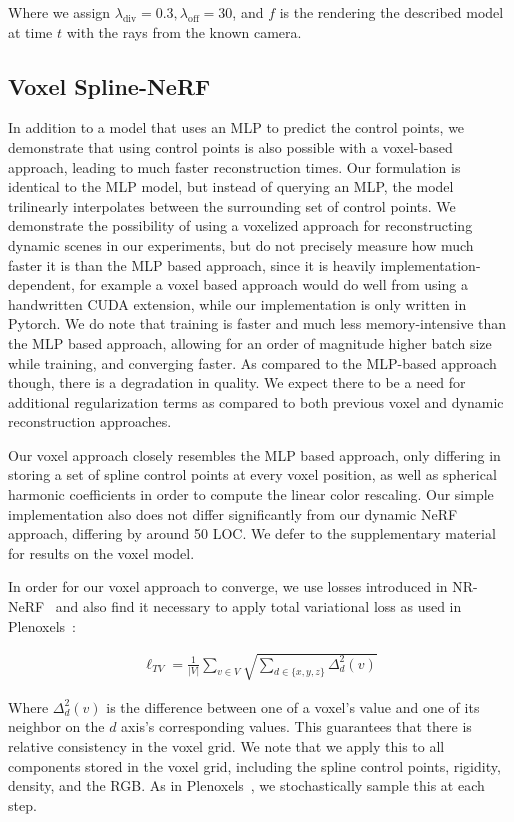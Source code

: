 Where we assign $\lambda_\text{div} = 0.3, \lambda_\text{off} = 30$, and $f$ is the rendering the described model at time $t$ with the rays from the known camera.

\subsection*{Voxel Spline-NeRF}

In addition to a model that uses an MLP to predict the control points, we demonstrate that using control points is also possible with a voxel-based approach, leading to much faster reconstruction times. Our formulation is identical to the MLP model, but instead of querying an MLP, the model trilinearly interpolates between the surrounding set of control points. We demonstrate the possibility of using a voxelized approach for reconstructing dynamic scenes in our experiments, but do not precisely measure how much faster it is than the MLP based approach, since it is heavily implementation-dependent, for example a voxel based approach would do well from using a handwritten CUDA extension, while our implementation is only written in Pytorch. We do note that training is faster and much less memory-intensive than the MLP based approach, allowing for an order of magnitude higher batch size while training, and converging faster. As compared to the MLP-based approach though, there is a degradation in quality. We expect there to be a need for additional regularization terms as compared to both previous voxel and dynamic reconstruction approaches.

Our voxel approach closely resembles the MLP based approach, only differing in storing a set of spline control points at every voxel position, as well as spherical harmonic coefficients in order to compute the linear color rescaling. Our simple implementation also does not differ significantly from our dynamic NeRF approach, differing by around 50 LOC. We defer to the supplementary material for results on the voxel model.

In order for our voxel approach to converge, we use losses introduced in NR-NeRF~\cite{tretschk2021nonrigid} and also find it necessary to apply total variational loss as used in Plenoxels~\cite{yu2021plenoxels}:

\begin{align}
    \ell_{TV} = \frac{1}{|V|} \sum_{v\in V} \sqrt{\sum_{d\in \{x,y,z\}} \Delta^2_d(v)}
\end{align}

Where $\Delta^2_d(v)$ is the difference between one of a voxel's value and one of its neighbor on the $d$ axis's corresponding values. This guarantees that there is relative consistency in the voxel grid. We note that we apply this to all components stored in the voxel grid, including the spline control points, rigidity, density, and the RGB. As in Plenoxels~\cite{yu2021plenoxels}, we stochastically sample this at each step.